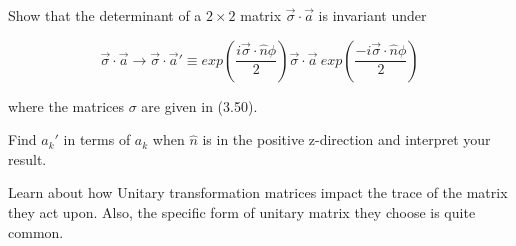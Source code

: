 \begin{question}

  \begin{questionpart}
    Show that the determinant of a $2 \times 2$ matrix
    $\vec{\sigma} \cdot \vec{a}$ is invariant under

    \begin{equation*}
      \vec{\sigma} \cdot \vec{a} \rightarrow \vec{\sigma} \cdot \vec{a}' \equiv
      exp \left( \frac{i\vec{\sigma} \cdot \hat{n}\phi}{2}\right)
      \vec{\sigma} \cdot \vec{a} \ 
      exp \left( \frac{-i\vec{\sigma} \cdot \hat{n}\phi}{2}\right)
    \end{equation*}

    where the matrices $\sigma$ are given in (3.50).\\
  \end{questionpart}

  \begin{questionpart}
    Find $a_k'$ in terms of $a_k$ when $\hat{n}$ is in the
    positive z-direction and interpret your result.\\
  \end{questionpart}

\end{question}

\begin{purpose}
  Learn about how Unitary transformation matrices impact the trace of
  the matrix they act upon.  Also, the specific form of unitary matrix
  they choose is quite common.
\end{purpose}

